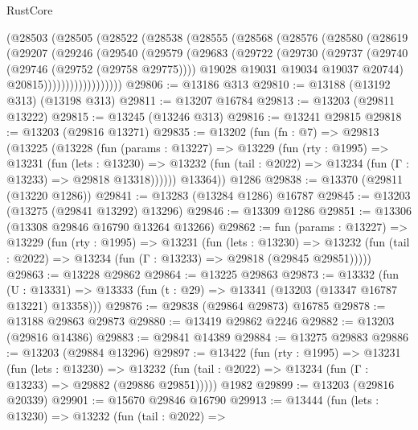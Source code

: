 \begin{lexlean}{RustCore}
\begin{coremodule}
        (@28503
          (@28505
            (@28522
              (@28538
                (@28555
                  (@28568
                    (@28576
                      (@28580
                        (@28619
                          (@29207
                            (@29246
                              (@29540
                                (@29579
                                  (@29683
                                    (@29722
                                      (@29730
                                        (@29737
                                          (@29740 (@29746 (@29752 (@29758 @29775))))
                                          @19028
                                          @19031
                                          @19034
                                          @19037
                                          @20744)
                                        @20815))))))))))))))))))
@29806 := @13186 @313
@29810 := @13188 (@13192 @313) (@13198 @313)
@29811 := @13207 @16784
@29813 := @13203 (@29811 @13222)
@29815 := @13245 (@13246 @313)
@29816 := @13241 @29815
@29818 := @13203 (@29816 @13271)
@29835 := @13202
    (fun (fn : @7) =>
    @29813
      (@13225
        (@13228
          (fun (params : @13227) =>
          @13229
            (fun (rty : @1995) =>
            @13231
              (fun (lets : @13230) =>
              @13232 (fun (tail : @2022) => @13234 (fun (Γ : @13233) => @29818 @13318))))))
        @13364))
    @1286
@29838 := @13370 (@29811 (@13220 @1286))
@29841 := @13283 (@13284 @1286) @16787
@29845 := @13203 (@13275 (@29841 @13292) @13296)
@29846 := @13309 @1286
@29851 := @13306 (@13308 @29846 @16790 @13264 @13266)
@29862 := fun (params : @13227) =>
  @13229
    (fun (rty : @1995) =>
    @13231
      (fun (lets : @13230) =>
      @13232 (fun (tail : @2022) => @13234 (fun (Γ : @13233) => @29818 (@29845 @29851)))))
@29863 := @13228 @29862
@29864 := @13225 @29863
@29873 := @13332
    (fun (U : @13331) => @13333 (fun (t : @29) => @13341 (@13203 (@13347 @16787 @13221) @13358)))
@29876 := @29838 (@29864 @29873) @16785
@29878 := @13188 @29863 @29873
@29880 := @13419 @29862 @2246
@29882 := @13203 (@29816 @14386)
@29883 := @29841 @14389
@29884 := @13275 @29883
@29886 := @13203 (@29884 @13296)
@29897 := @13422
    (fun (rty : @1995) =>
    @13231
      (fun (lets : @13230) =>
      @13232 (fun (tail : @2022) => @13234 (fun (Γ : @13233) => @29882 (@29886 @29851)))))
    @1982
@29899 := @13203 (@29816 @20339)
@29901 := @15670 @29846 @16790
@29913 := @13444
    (fun (lets : @13230) =>
    @13232
      (fun (tail : @2022) =>

\end{coremodule}
\end{lexlean}
